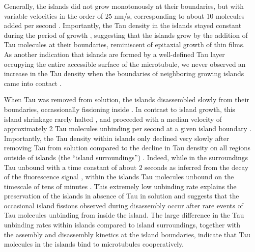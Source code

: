 Generally, the islands did not grow monotonously at their boundaries, but with variable velocities in the order of 25 nm/s, corresponding to about 10 molecules added per second . Importantly, the Tau density in the islands stayed constant during the period of growth , suggesting that the islands grow by the addition of Tau molecules at their boundaries, reminiscent of epitaxial growth of thin films. As another indication that islands are formed by a well-defined Tau layer occupying the entire accessible surface of the microtubule, we never observed an increase in the Tau density when the boundaries of neighboring growing islands came into contact .\par

When Tau was removed from solution, the islands disassembled slowly from their boundaries, occassionally fissioning inside . In contrast to island growth, this island shrinkage rarely halted , and proceeded with a median velocity of approximately 2 Tau molecules unbinding per second at a given island boundary . Importantly, the Tau density within islands only declined very slowly after removing Tau from solution compared to the decline in Tau density on all regions outside of islands (the “island surroundings”) . Indeed, while in the surroundings Tau unbound with a time constant of about 2 seconds as inferred from the decay of the fluorescence signal , within the islands Tau molecules unbound on the timescale of tens of minutes . This extremely low unbinding rate explains the preservation of the islands in absence of Tau in solution and suggests that the occasional island fissions observed during disassembly occur after rare events of Tau molecules unbinding from inside the island. The large difference in the Tau unbinding rates within islands compared to island surroundings, together with the assembly and disassembly kinetics at the island boundaries, indicate that Tau molecules in the islands bind to microtubules cooperatively. 


